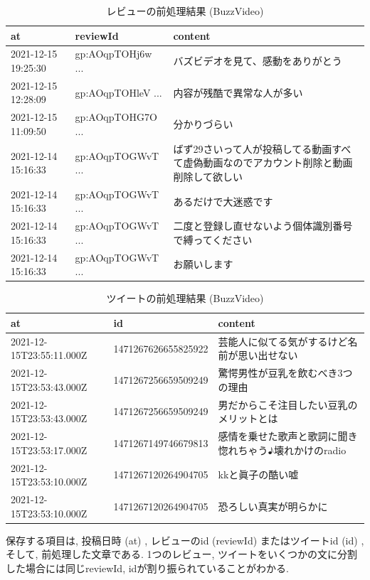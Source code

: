 \begin{table}[H]
  \caption{レビューの前処理結果 (BuzzVideo) }
  \label{tb:googlecsv}
  \begin{center}
  \begin{tabularx}{\linewidth}{|l|l|X|}
    \hline
    at&reviewId&content\\\hline\hline
    2021-12-15 19:25:30&gp:AOqpTOHj6w ...&バズビデオを見て、感動をありがとう\\\hline
    2021-12-15 12:28:09&gp:AOqpTOHleV ...&内容が残酷で異常な人が多い\\\hline
    2021-12-15 11:09:50&gp:AOqpTOHG7O ...&分かりづらい\\\hline
    2021-12-14 15:16:33&gp:AOqpTOGWvT ...&ばず29さいって人が投稿してる動画すべて虚偽動画なのでアカウント削除と動画削除して欲しい\\\hline
    2021-12-14 15:16:33&gp:AOqpTOGWvT ...&あるだけで大迷惑です\\\hline
    2021-12-14 15:16:33&gp:AOqpTOGWvT ...&二度と登録し直せないよう個体識別番号で縛ってください\\\hline
    2021-12-14 15:16:33&gp:AOqpTOGWvT ...&お願いします\\\hline
  \end{tabularx}\end{center}
\end{table}

\begin{table}[H]
  \caption{ツイートの前処理結果 (BuzzVideo) }
  \label{tb:twittercsv}
  \begin{center}
  \begin{tabularx}{\linewidth}{|l|l|X|}
    \hline
    at&id&content\\\hline\hline
    2021-12-15T23:55:11.000Z&1471267626655825922&芸能人に似てる気がするけど名前が思い出せない\\\hline
    2021-12-15T23:53:43.000Z&1471267256659509249&驚愕男性が豆乳を飲むべき3つの理由\\\hline
    2021-12-15T23:53:43.000Z&1471267256659509249&男だからこそ注目したい豆乳のメリットとは\\\hline
    2021-12-15T23:53:17.000Z&1471267149746679813&感情を乗せた歌声と歌詞に聞き惚れちゃう♪壊れかけのradio\\\hline
    2021-12-15T23:53:10.000Z&1471267120264904705&kkと眞子の酷い嘘\\\hline
    2021-12-15T23:53:10.000Z&1471267120264904705&恐ろしい真実が明らかに\\\hline
  \end{tabularx}\end{center}
\end{table}
保存する項目は, 投稿日時 (at) , レビューのid (reviewId) またはツイートid (id) , そして, 前処理した文章である. 
1つのレビュー, ツイートをいくつかの文に分割した場合には同じreviewId, idが割り振られていることがわかる. 

